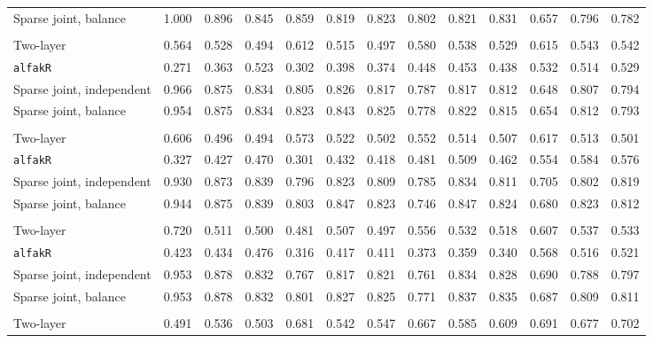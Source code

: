 \begin{center}
\begin{tabular}{l*{12}{r}}
\quad Sparse joint, balance & 1.000 & 0.896 & 0.845 & 0.859 & 0.819 & 0.823 & 0.802 & 0.821 & 0.831 & 0.657 & 0.796 & 0.782 \\
\addlinespace[2pt]
\multicolumn{13}{l}{\textit{500/700, 360 d}} \\
\quad Two-layer & 0.564 & 0.528 & 0.494 & 0.612 & 0.515 & 0.497 & 0.580 & 0.538 & 0.529 & 0.615 & 0.543 & 0.542 \\
\quad \texttt{alfakR} & 0.271 & 0.363 & 0.523 & 0.302 & 0.398 & 0.374 & 0.448 & 0.453 & 0.438 & 0.532 & 0.514 & 0.529 \\
\quad Sparse joint, independent & 0.966 & 0.875 & 0.834 & 0.805 & 0.826 & 0.817 & 0.787 & 0.817 & 0.812 & 0.648 & 0.807 & 0.794 \\
\quad Sparse joint, balance & 0.954 & 0.875 & 0.834 & 0.823 & 0.843 & 0.825 & 0.778 & 0.822 & 0.815 & 0.654 & 0.812 & 0.793 \\
\addlinespace[2pt]
\multicolumn{13}{l}{\textit{500/700, 1080 d}} \\
\quad Two-layer & 0.606 & 0.496 & 0.494 & 0.573 & 0.522 & 0.502 & 0.552 & 0.514 & 0.507 & 0.617 & 0.513 & 0.501 \\
\quad \texttt{alfakR} & 0.327 & 0.427 & 0.470 & 0.301 & 0.432 & 0.418 & 0.481 & 0.509 & 0.462 & 0.554 & 0.584 & 0.576 \\
\quad Sparse joint, independent & 0.930 & 0.873 & 0.839 & 0.796 & 0.823 & 0.809 & 0.785 & 0.834 & 0.811 & 0.705 & 0.802 & 0.819 \\
\quad Sparse joint, balance & 0.944 & 0.875 & 0.839 & 0.803 & 0.847 & 0.823 & 0.746 & 0.847 & 0.824 & 0.680 & 0.823 & 0.812 \\
\addlinespace[2pt]
\multicolumn{13}{l}{\textit{500/700, bottleneck}} \\
\quad Two-layer & 0.720 & 0.511 & 0.500 & 0.481 & 0.507 & 0.497 & 0.556 & 0.532 & 0.518 & 0.607 & 0.537 & 0.533 \\
\quad \texttt{alfakR} & 0.423 & 0.434 & 0.476 & 0.316 & 0.417 & 0.411 & 0.373 & 0.359 & 0.340 & 0.568 & 0.516 & 0.521 \\
\quad Sparse joint, independent & 0.953 & 0.878 & 0.832 & 0.767 & 0.817 & 0.821 & 0.761 & 0.834 & 0.828 & 0.690 & 0.788 & 0.797 \\
\quad Sparse joint, balance & 0.953 & 0.878 & 0.832 & 0.801 & 0.827 & 0.825 & 0.771 & 0.837 & 0.835 & 0.687 & 0.809 & 0.811 \\
\addlinespace[2pt]
\multicolumn{13}{l}{\textit{100/3000, 360 d}} \\
\quad Two-layer & 0.491 & 0.536 & 0.503 & 0.681 & 0.542 & 0.547 & 0.667 & 0.585 & 0.609 & 0.691 & 0.677 & 0.702 \\

\end{tabular}
\end{center}
